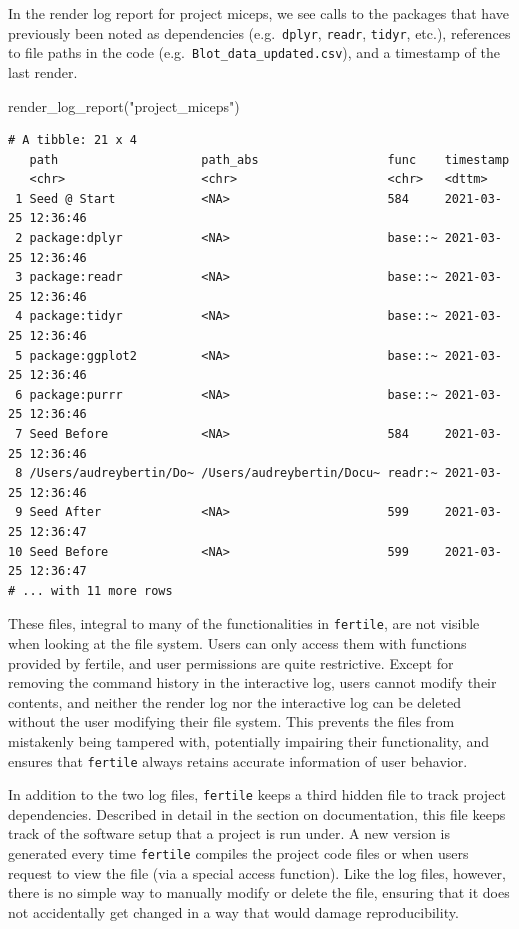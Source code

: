 \documentclass[12pt,twoside]{reedthesis}
\newenvironment{Shaded}{\begin{snugshade}}{\end{snugshade}}
\newcommand{\FunctionTok}[1]{\textcolor[rgb]{0.00,0.00,0.00}{#1}}
\newcommand{\NormalTok}[1]{#1}
\newcommand{\StringTok}[1]{\textcolor[rgb]{0.31,0.60,0.02}{#1}}
\begin{document}
In the render log report for project miceps, we see calls to the packages that have previously been noted as dependencies (e.g.~\texttt{dplyr}, \texttt{readr}, \texttt{tidyr}, etc.), references to file paths in the code (e.g.~\texttt{Blot\_data\_updated.csv}), and a timestamp of the last render.
\begin{Shaded}
\begin{Highlighting}[]
\FunctionTok{render\_log\_report}\NormalTok{(}\StringTok{"project\_miceps"}\NormalTok{)}
\end{Highlighting}
\end{Shaded}
\footnotesize
\begin{verbatim}
# A tibble: 21 x 4
   path                    path_abs                  func    timestamp          
   <chr>                   <chr>                     <chr>   <dttm>             
 1 Seed @ Start            <NA>                      584     2021-03-25 12:36:46
 2 package:dplyr           <NA>                      base::~ 2021-03-25 12:36:46
 3 package:readr           <NA>                      base::~ 2021-03-25 12:36:46
 4 package:tidyr           <NA>                      base::~ 2021-03-25 12:36:46
 5 package:ggplot2         <NA>                      base::~ 2021-03-25 12:36:46
 6 package:purrr           <NA>                      base::~ 2021-03-25 12:36:46
 7 Seed Before             <NA>                      584     2021-03-25 12:36:46
 8 /Users/audreybertin/Do~ /Users/audreybertin/Docu~ readr:~ 2021-03-25 12:36:46
 9 Seed After              <NA>                      599     2021-03-25 12:36:47
10 Seed Before             <NA>                      599     2021-03-25 12:36:47
# ... with 11 more rows
\end{verbatim}
\normalsize

These files, integral to many of the functionalities in \texttt{fertile}, are not visible when looking at the file system. Users can only access them with functions provided by fertile, and user permissions are quite restrictive. Except for removing the command history in the interactive log, users cannot modify their contents, and neither the render log nor the interactive log can be deleted without the user modifying their file system. This prevents the files from mistakenly being tampered with, potentially impairing their functionality, and ensures that \texttt{fertile} always retains accurate information of user behavior.

In addition to the two log files, \texttt{fertile} keeps a third hidden file to track project dependencies. Described in detail in the section on documentation, this file keeps track of the software setup that a project is run under. A new version is generated every time \texttt{fertile} compiles the project code files or when users request to view the file (via a special access function). Like the log files, however, there is no simple way to manually modify or delete the file, ensuring that it does not accidentally get changed in a way that would damage reproducibility.
\end{document}
